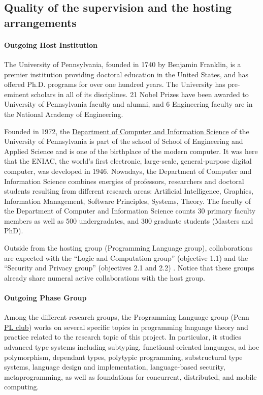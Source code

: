 \documentclass{article}[11pt]
\begin{document}
\subsection{Quality of the supervision and the hosting arrangements}
\paragraph{Outgoing Host Institution}
The University of Pennsylvania, founded in 1740 by Benjamin Franklin, is a premier institution providing doctoral education in the United States, and has offered Ph.D. programs for over one hundred years. The University has pre-eminent scholars in all of its disciplines. 21 Nobel Prizes have been awarded to University of Pennsylvania faculty and alumni, and 6 Engineering faculty are in the National Academy of Engineering.

Founded in 1972, the \href{http://www.cis.upenn.edu/index.php}{Department of Computer and Information Science} of the University of Pennsylvania is part of the school of School of Engineering and Applied Science and is one of the birthplace of the modern computer. It was here that the ENIAC, the world's first electronic, large-scale, general-purpose
digital computer, was developed in 1946. Nowadays, the Department of Computer and
Information Science combines energies of professors, researchers and doctoral students resulting
from different research areas: Artificial Intelligence, Graphics, Information Management,
Software Principles, Systems, Theory. The faculty of the Department of Computer and
Information Science counts 30 primary faculty members as well as 500 undergradates, and 300 graduate students (Masters and PhD).

Outside from the hosting group (Programming Language group), collaborations are expected with the ``Logic and Computation group'' (objective 1.1) and the ``Security and Privacy group'' (objectives 2.1 and 2.2) . Notice that these groups already share numeral active collaborations with the host group.


\paragraph{Outgoing Phase Group}
Among the different research groups, the Programming Language group (Penn \href{http://www.cis.upenn.edu/~plclub/}{PL club})
works on several specific topics in programming language theory and practice related to the
research topic of this project. In particular, it studies advanced type systems including subtyping,
functional-oriented languages, ad hoc polymorphism, dependant types, polytypic programming, substructural type systems, language design and implementation, language-based security, metaprogramming, as well as
foundations for concurrent, distributed, and mobile computing. 
\end{document}
